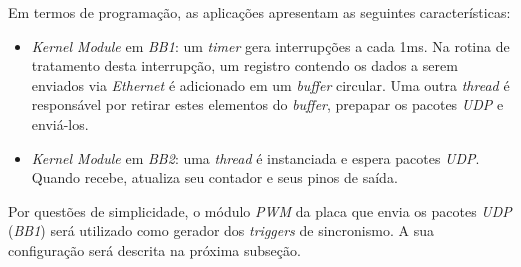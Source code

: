 \vspace{12pt}

Em termos de programação, as aplicações apresentam as seguintes características:

\begin{itemize} \renewcommand\labelitemi{--}
  \item \textit{Kernel Module} em \textit{BB1}: um \textit{timer} gera
  interrupções a cada 1ms. Na rotina de tratamento desta interrupção, um
  registro contendo os dados a serem enviados via \textit{Ethernet} é
  adicionado em um \textit{buffer} circular. Uma outra \textit{thread}
  é responsável por retirar estes elementos do \textit{buffer}, prepapar os
  pacotes \textit{UDP} e enviá-los.

  \item \textit{Kernel Module} em \textit{BB2}: uma \textit{thread} é
  instanciada e espera pacotes \textit{UDP}. Quando recebe, atualiza seu
  contador e seus pinos de saída.
\end{itemize}

Por questões de simplicidade, o módulo \textit{PWM} da placa que envia os
pacotes \textit{UDP} (\textit{BB1}) será utilizado como gerador dos
\textit{triggers} de sincronismo. A sua configuração será descrita na próxima subseção.

